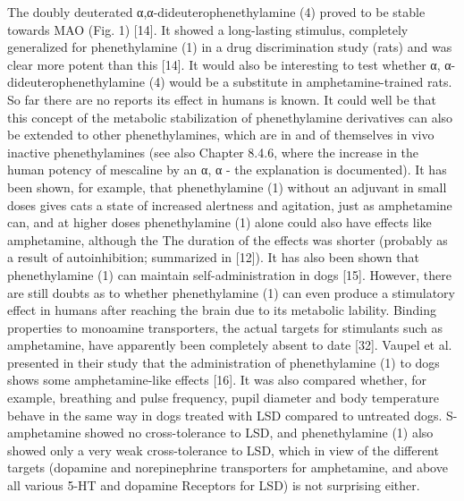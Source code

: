 The doubly deuterated α,α-dideuterophenethylamine (4) proved to be stable towards MAO (Fig. 1) [14]. It showed a long-lasting stimulus, completely generalized for phenethylamine (1) in a drug discrimination study (rats) and was clear
more potent than this [14]. It would also be interesting to test whether α, α-dideuterophenethylamine (4) would be a substitute in amphetamine-trained rats. So far there are no reports
its effect in humans is known. It could well be that this concept of the metabolic stabilization of phenethylamine derivatives can also be extended to other phenethylamines, which are in and of themselves in vivo inactive phenethylamines (see also Chapter 8.4.6, where the increase in the human potency of mescaline by an α, α - the explanation is documented).
It has been shown, for example, that phenethylamine (1) without an adjuvant in small doses gives cats a state of increased alertness and agitation, just as amphetamine can, and at higher doses phenethylamine (1) alone could also have effects like amphetamine, although the The duration of the effects was shorter (probably as a result of autoinhibition; summarized in [12]). It has also been shown that phenethylamine (1) can maintain self-administration in dogs [15]. However, there are still doubts as to whether phenethylamine (1) can even produce a stimulatory effect in humans after reaching the brain due to its metabolic lability. Binding properties to monoamine transporters, the actual targets for stimulants such as amphetamine, have apparently been completely absent to date [32].
Vaupel et al. presented in their study that the administration of phenethylamine (1) to dogs shows some amphetamine-like effects [16]. It was also compared whether, for example, breathing and pulse frequency, pupil diameter and body temperature
behave in the same way in dogs treated with LSD compared to untreated dogs.
S-amphetamine showed no cross-tolerance to LSD, and phenethylamine (1) also showed only a very weak cross-tolerance to LSD, which in view of the different targets (dopamine and norepinephrine transporters for amphetamine, and above all various 5-HT and dopamine Receptors for LSD) is not surprising either.

